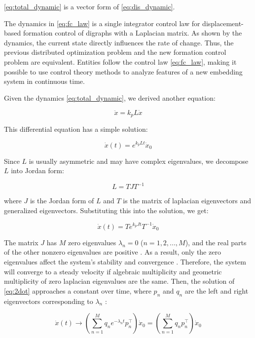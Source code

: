 \documentclass[letterpaper, 10 pt, conference]{ieeeconf}  %
\begin{document}
\noindent \eqref{eq:total_dynamic} is a vector form of \eqref{eq:dis_dynamic}.

The dynamics in \eqref{eq:fc_law} is a single integrator control law for displacement-based formation control of digraphs with a Laplacian matrix. As shown by the dynamics, the current state directly influences the rate of change. Thus, the previous distributed optimization problem and the new formation control problem are equivalent. Entities follow the control law \eqref{eq:fc_law}, making it possible to use control theory methods to analyze features of a new embedding system in continuous time.

Given the dynamics \eqref{eq:total_dynamic}, we derived another equation:

\begin{equation}
    \ddot{x} = k_p L \dot{x}
    \label{eq:2dot}
\end{equation}

\noindent This differential equation has a simple solution:

\[ 
    \dot{x}(t) = e^{k_p Lt} \dot{x}_0 
\]

\noindent Since \( L \) is usually asymmetric and may have complex eigenvalues, we decompose \( L \) into Jordan form:

\[ 
    L = T J T^{-1} 
\]

\noindent where \( J \) is the Jordan form of \( L \) and \( T \) is the matrix of laplacian eigenvectors and generalized eigenvectors. Substituting this into the solution, we get:

\[ 
    \dot{x}(t) = T e^{k_p J t} T^{-1} \dot{x}_0 
\]

\noindent The matrix \( J \) has \( M \) zero eigenvalues \( \lambda_n = 0 \) (\( n = 1,2,...,M \)), and the real parts of the other nonzero eigenvalues are positive \cite{mirzaev_laplacian_2013}. As a result, only the zero eigenvalues affect the system's stability and convergence \cite{mesbahi_graph_2010}. Therefore, the system will converge to a steady velocity if algebraic multiplicity and geometric multiplicity of zero laplacian eigenvalues are the same. Then, the solution of \eqref{eq:2dot} approaches a constant over time, where \( p_n \) and \( q_n \) are the left and right eigenvectors corresponding to \( \lambda_n \)  \cite{mesbahi_graph_2010}:

\begin{equation}
    \dot{x}(t) \rightarrow \left( \sum_{n=1}^M q_n e^{-\lambda_n t} p_n^\top \right) \dot{x}_0 = \left( \sum_{n=1}^M q_n p_n^\top \right) \dot{x}_0
    \label{eq:solution}
\end{equation}
\end{document}
